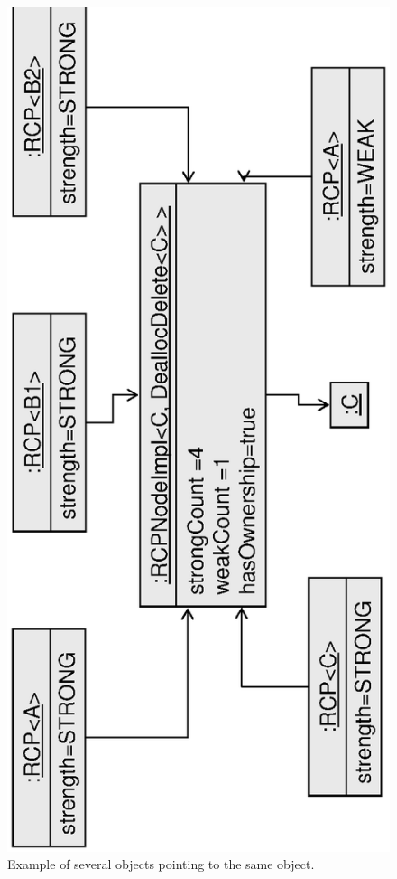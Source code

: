 \documentclass[pdf,ps2pdf,11pt]{SANDreport}
\begin{document}
{\bsinglespace
\begin{figure}
\begin{center}
\includegraphics*[angle=270,scale=0.65]{RCPEx1}
\end{center}
\caption{
\label{fig:RCPEx1}
Example of several {} objects pointing to the same
{} object.  }
\end{figure}
\esinglespace}
\end{document}
